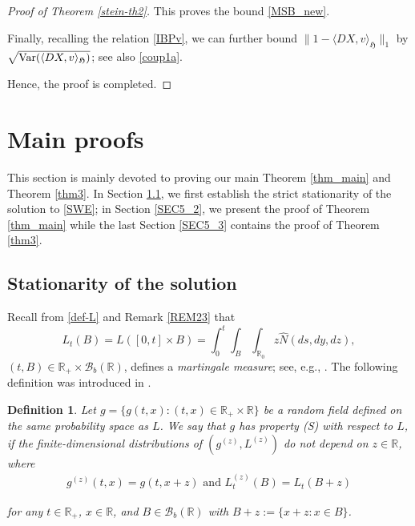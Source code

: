 \documentclass[letterpaper, 11pt,  reqno]{amsart}
\newcommand{\wh}{\widehat}
\newtheorem{definition}[theorem]{Definition}
\newcommand{\noi}{\noindent}
\newcommand{\R}{\mathbb{R}}
\newcommand{\cB}{\mathcal{B}}
\newcommand{\Var}{\textup{Var}}
\newcommand{\fH}{\mathfrak{H}}
\numberwithin{equation}{section}
\numberwithin{theorem}{section}
\begin{document}
\begin{proof}[Proof of Theorem \ref{stein-th2}]
\noi
This proves the bound \eqref{MSB_new}.

 

 Finally, recalling the relation \eqref{IBPv}, 
 we can further bound 
$ \| 1 -\langle DX, v \rangle_{\fH} \|_1$ by $\sqrt{ \Var(\langle DX, v \rangle_{\fH} )}$;
see also \eqref{coup1a}.

\smallskip

Hence, the proof is completed. 
\qedhere
 
  
   
\end{proof}

 
 
 
 
 
 

\section{Main proofs} \label{SEC5A}

This section is mainly devoted to proving our main Theorem \ref{thm_main}
and Theorem \ref{thm3}.
In Section \ref{SEC5_1}, we first establish 
the strict stationarity of the solution to \eqref{SWE};
in Section \ref{SEC5_2}, 
we present the proof of  Theorem \ref{thm_main}
while the last Section \ref{SEC5_3} contains
the proof of Theorem \ref{thm3}.



\subsection{Stationarity of the solution}
\label{SEC5_1}


Recall from \eqref{def-L} and Remark \ref{REM23} that 
\[
L_t(B) = L([0,t]\times B) = \int_0^t \int_B \int_{\R_0} z \wh{N}(ds, dy, dz),
\]
$(t, B)\in\R_+\times \cB_b(\R)$,
defines  a {\it martingale measure}; see, e.g., \cite[Section 2]{dalang99}.
The following definition
   was introduced in \cite[Definition 5.1]{dalang99}.

\begin{definition}
Let $g=\{g(t,x): (t,x)\in\R_+\times \R\}$ be a random field  defined on the same probability space as 
$L$.
We say that $g$  has property {\rm (S)}  with respect to $L$,
 if the finite-dimensional distributions of $(g^{(z)}, L^{(z)} )$
 do not depend on $z\in \R$,
where 
\begin{align}\label{XLz}
\text{$g^{(z)}(t,x)=g(t,x+z)$ and $L_t^{(z)}(B)=L_t(B+z)$}
\end{align}

\noi
for any $t\in\R_+$, $x\in\R$, and $B\in\cB_b(\R)$ with $B+z:=\{ x+z: x\in B\}$.
\end{definition}
\end{document}
